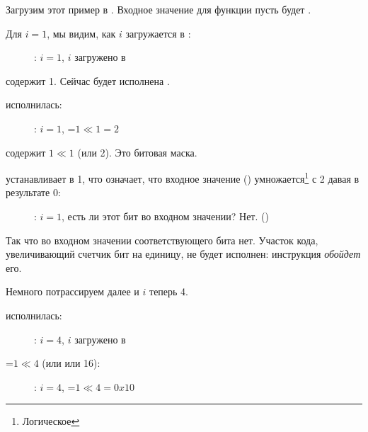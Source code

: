 ﻿\clearpage
\mysubparagraph{\olly}
\myindex{\olly}

Загрузим этот пример в \olly. 
Входное значение для функции пусть будет .

Для $i=1$, мы видим, как $i$ загружается в \ECX: 

\begin{figure}[H]
\centering
{}
\caption{\olly: $i=1$, $i$ загружено в \ECX}
\label{fig:shifts_olly1_1}
\end{figure}

\EDX содержит 1. Сейчас будет исполнена \SHL.

\clearpage
\SHL исполнилась:

\begin{figure}[H]
\centering
{}
\caption{\olly: $i=1$, \EDX=$1 \ll 1=2$}
\label{fig:shifts_olly1_2}
\end{figure}

\EDX содержит $1 \ll 1$ (или 2). Это битовая маска.

\clearpage
\AND устанавливает \ZF в 1, 
что означает, что входное значение () 
умножается\footnote{Логическое } с 2 давая в результате 0:

\begin{figure}[H]
\centering
{}
\caption{\olly: $i=1$, есть ли этот бит во входном значении? Нет.
 ()}
\label{fig:shifts_olly1_3}
\end{figure}

Так что во входном значении соответствующего бита нет.
Участок кода, увеличивающий счетчик бит на единицу, не будет исполнен: инструкция \JZ \emph{обойдет} его.

\clearpage
Немного потрассируем далее и $i$ теперь 4.%

\SHL исполнилась:

\begin{figure}[H]
\centering
{}
\caption{\olly: $i=4$, $i$ загружено в \ECX}
\label{fig:shifts_olly4_1}
\end{figure}

\clearpage
\EDX=$1 \ll 4$ (или  или 16): 

\begin{figure}[H]
\centering
{}
\caption{\olly: $i=4$, \EDX=$1 \ll 4=0x10$}
\label{fig:shifts_olly4_2}
\end{figure}

